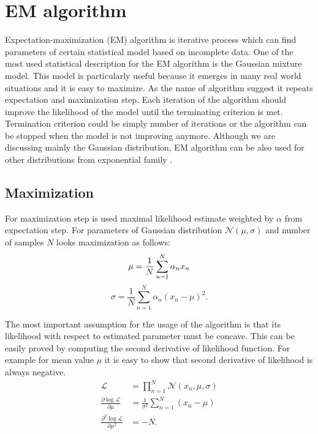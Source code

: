 \section{EM algorithm}
Expectation-maximization (EM) algorithm is iterative process which can find parameters of certain statistical model based on incomplete data. One of the most used statistical description for the EM algorithm is the Gaussian mixture model. This model is particularly useful because it emerges in many real world situations and it is easy to maximize. As the name of algorithm suggest it repeats expectation and maximization step. Each iteration of the algorithm should improve the likelihood of the model until the terminating criterion is met. Termination criterion could be simply number of iterations or the algorithm can be stopped when the model is not improving anymore. Although we are discussing mainly the Gaussian distribution, EM algorithm can be also used for other distributions from exponential family
 \cite{dempster1977}. 
 
 \subsection{Maximization}
For maximization step is used maximal likelihood estimate weighted by $\alpha$ from expectation step. For parameters of Gaussian distribution $\mathcal{N}(\mu, \sigma)$ and number of samples $N$ looks maximization as follows:
\begin{equation}
\mu = \frac{1}{N} \sum_{n = 1}^{N} \alpha_n x_n \\
\end{equation}
\begin{equation}
\sigma = \frac{1}{N} \sum_{n = 1}^{N}\alpha_n (x_n - \mu)^2.
\end{equation}

The most important assumption for the usage of the algorithm is that its likelihood with respect to estimated parameter must be concave. This can be easily proved by computing the second derivative of likelihood function. For example for mean value $\mu$ it is easy to show that second derivative of likelihood is always negative.
\begin{align}
\mathcal{L} &= \prod_{n=1}^N \mathcal{N}(x_n, \mu, \sigma) \\
\frac{\partial \log \mathcal{L}}{\partial \mu} &= \frac{1}{\sigma^2} \sum_{n = 1}^{N} (x_n - \mu) \\
\frac{\partial^2 \log \mathcal{L}}{\partial \mu^2} &= -N.
\end{align}


